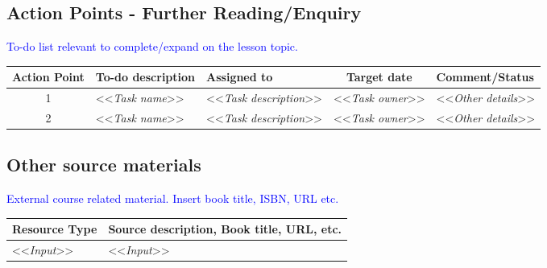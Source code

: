 {\subsection{Action Points - Further Reading/Enquiry}

{\textcolor{blue}{To-do list relevant to complete/expand on the lesson topic.}}

\begin{adjustbox}{max width=\textwidth}
    \begin{tabular}{c|l|l|c|l}
        {\bfseries{Action Point}} & {\bfseries{To-do description}} & {\bfseries{Assigned to}} & {\bfseries{Target date}} & {\bfseries{Comment/Status}} \\
        \hline
        1 & <<{\emph{Task name}}>> & <<{\emph{Task description}}>> & <<{\emph{Task owner}}>> & <<{\emph{Other details}}>> \\ \hline
        2 & <<{\emph{Task name}}>> & <<{\emph{Task description}}>> & <<{\emph{Task owner}}>> & <<{\emph{Other details}}>> \\ \hline
    \end{tabular}
\end{adjustbox}




\subsection{Other source materials} 

{\textcolor{blue}{External course related material. Insert book title, ISBN, URL etc. }}

\begin{tabular}{p{40mm} | p{120mm}}
    {\bfseries{Resource Type}} & {\bfseries{Source description, Book title, URL, etc.}}\\
    \hline
    <<{\emph{Input}}>> & <<{\emph{Input}}>>\\ \hline
\end{tabular}


}
